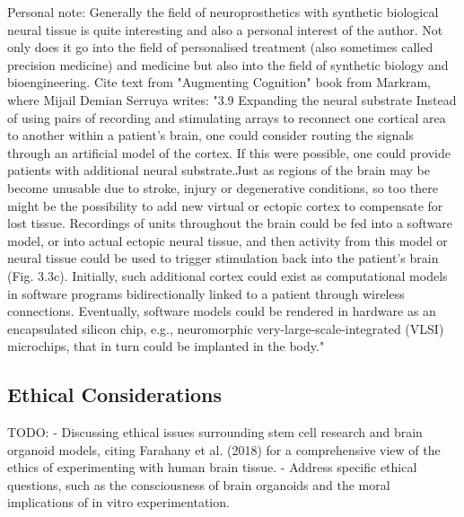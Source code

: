 \documentclass[10pt]{article}
\begin{document}
\begin{sloppypar}
  Personal note: Generally the field of neuroprosthetics with synthetic biological neural tissue is quite interesting and also a personal interest of the author. Not only does it go into the field of personalised treatment (also sometimes called precision medicine) and medicine but also into the field of synthetic biology and bioengineering. Cite text from "Augmenting Cognition" book from Markram, where Mijail Demian Serruya writes: "3.9 Expanding the neural substrate  Instead of using pairs of recording and stimulating arrays to reconnect one cortical area to another within a patient’s brain, one could  consider routing the signals through an artificial model of the cortex.  If this were possible, one could provide patients with additional neural substrate.Just as regions of the brain may be become unusable due  to stroke, injury or degenerative conditions, so too there might be the  possibility to add new virtual or ectopic cortex to compensate for lost  tissue. Recordings of units throughout the brain could be fed into a  software model, or into actual ectopic neural tissue, and then activity from this model or neural tissue could be used to trigger stimulation back into the patient’s brain (Fig. 3.3c). Initially, such additional cortex could exist as computational models in software programs  bidirectionally linked to a patient through wireless connections. Eventually, software models could be rendered in hardware as an encapsulated silicon chip, e.g., neuromorphic very-large-scale-integrated  (VLSI) microchips, that in turn could be implanted in the body."

  \subsection{Ethical Considerations}
  \label{sec:ethical-considerations}

  TODO:
  - Discussing ethical issues surrounding stem cell research and brain organoid models, citing Farahany et al. (2018) for a comprehensive view of the ethics of experimenting with human brain tissue.
  - Address specific ethical questions, such as the consciousness of brain organoids and the moral implications of in vitro experimentation.


\end{sloppypar}
\end{document}
